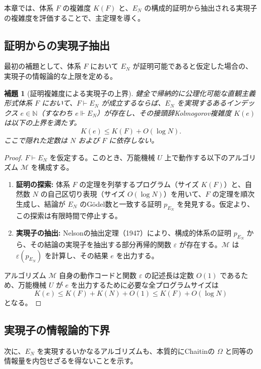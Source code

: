 \documentclass[a4paper,11pt]{ltjsarticle}
\theoremstyle{plain}
\newtheorem{lemma}{補題}
\begin{document}
本章では、体系 $F$ の複雑度 $K(F)$ と、$E_N$ の構成的証明から抽出される実現子の複雑度を評価することで、主定理を導く。

\subsection{証明からの実現子抽出}

最初の補題として、体系 $F$ において $E_N$ が証明可能であると仮定した場合の、実現子の情報論的な上限を定める。

\begin{lemma}[証明複雑度による実現子の上界]
健全で帰納的に公理化可能な直観主義形式体系 $F$ において、$F \vdash E_N$ が成立するならば、$E_N$ を実現するあるインデックス $e \in \mathbb{N}$（すなわち $e \Vdash E_N$）が存在し、その接頭辞Kolmogorov複雑度 $K(e)$ は以下の上界を満たす。
\[
K(e) \le K(F) + O(\log N).
\]
ここで隠れた定数は $N$ および $F$ に依存しない。
\end{lemma}

\begin{proof}
$F \vdash E_N$ を仮定する。このとき、万能機械 $U$ 上で動作する以下のアルゴリズム $\mathcal{M}$ を構成する。
\begin{enumerate}
\item \textbf{証明の探索:} 体系 $F$ の定理を列挙するプログラム（サイズ $K(F)$）と、自然数 $N$ の自己区切り表現（サイズ $O(\log N)$）を用いて、$F$ の定理を順次生成し、結論が $E_N$ のGödel数と一致する証明 $p_{E_N}$ を発見する。仮定より、この探索は有限時間で停止する。
\item \textbf{実現子の抽出:} Nelsonの抽出定理（1947）により、構成的体系の証明 $p_{E_N}$ から、その結論の実現子を抽出する部分再帰的関数 $\varepsilon$ が存在する。$\mathcal{M}$ は $\varepsilon(p_{E_N})$ を計算し、その結果 $e$ を出力する。
\end{enumerate}
アルゴリズム $\mathcal{M}$ 自身の動作コードと関数 $\varepsilon$ の記述長は定数 $O(1)$ であるため、万能機械 $U$ が $e$ を出力するために必要な全プログラムサイズは
\[
K(e) \le K(F) + K(N) + O(1) \le K(F) + O(\log N)
\]
となる。
\end{proof}

\subsection{実現子の情報論的下界}

次に、$E_N$ を実現するいかなるアルゴリズムも、本質的にChaitinの $\Omega$ と同等の情報量を内包せざるを得ないことを示す。
\end{document}
